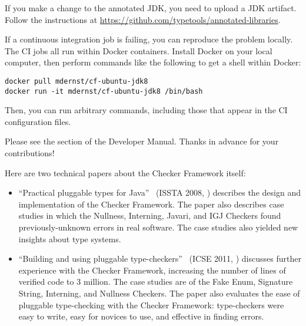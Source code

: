 If you make a change to the
annotated JDK, you need to upload a JDK artifact.
Follow the instructions at
\url{https://github.com/typetools/annotated-libraries}.



If a continuous integration job is failing, you can reproduce the problem locally.
The CI jobs all run within Docker containers.
Install Docker on your local computer, then perform commands like the
following to get a shell within Docker:

\begin{Verbatim}
docker pull mdernst/cf-ubuntu-jdk8
docker run -it mdernst/cf-ubuntu-jdk8 /bin/bash
\end{Verbatim}

Then, you can run arbitrary commands, including those that appear in the
CI configuration files.



Please see the
 section of the Developer Manual.
Thanks in advance for your contributions!



Here are two technical papers about the Checker Framework itself:

\begin{itemize}
\item
``Practical pluggable types for Java''~\cite{PapiACPE2008}
(ISSTA 2008, )
describes the design and implementation of the Checker Framework.
The paper also describes case
studies in which the Nullness, Interning, Javari, and IGJ Checkers found
previously-unknown errors in real software.
The case studies also yielded new insights about type systems.

\item
``Building and using pluggable
type-checkers''~\cite{DietlDEMS2011}
(ICSE 2011, )
discusses further experience with the Checker Framework, increasing the
number of lines of verified code to 3 million.  The case studies are of the
Fake Enum, Signature String, Interning, and Nullness Checkers.
The paper also evaluates the ease
of pluggable type-checking with the Checker Framework:  type-checkers
were easy to write, easy for novices to use, and effective in finding
errors.
\end{itemize}

